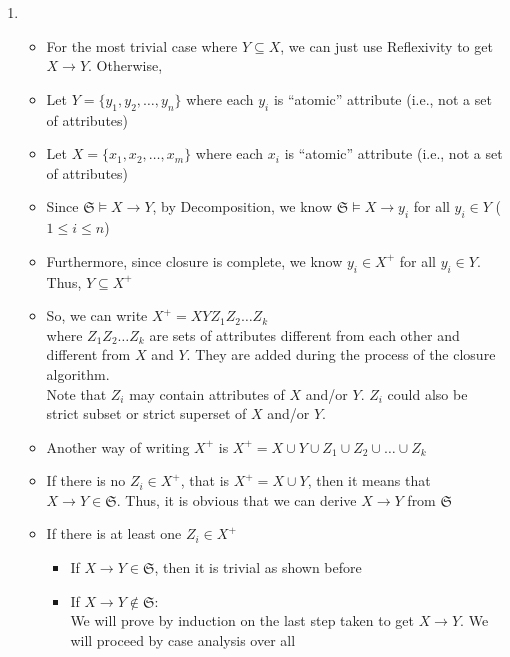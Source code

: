 \documentclass[12pt]{article}
\begin{document}
\begin{enumerate}
  \item 
    \begin{itemize}
      \item For the most trivial case where $Y \subseteq X$, we can just use
            Reflexivity to get $X \longrightarrow Y$. Otherwise,
      \item Let $Y = \{y_1, y_2, \dots, y_n\}$ where each $y_i$ is ``atomic''
            attribute (i.e., not a set of attributes)
      \item Let $X = \{x_1, x_2, \dots, x_m\}$ where each $x_i$ is ``atomic''
            attribute (i.e., not a set of attributes)
      \item Since $\mathfrak{S} \vDash X \longrightarrow Y$, by Decomposition,
            we know $\mathfrak{S} \vDash X \longrightarrow y_i$ for all $y_i \in
            Y$ ($1 \leq i \leq n$)
      \item Furthermore, since closure is complete, we know $y_i \in X^+$ for
            all $y_i \in Y$. Thus, $Y \subseteq X^+$
      \item So, we can write $X^+ = X Y Z_1 Z_2 \dots Z_k$ \\
            where $Z_1 Z_2 \dots Z_k$ are sets of attributes different from each
            other and different from $X$ and $Y$. They are added during the
            process of the closure algorithm. \\
            Note that $Z_i$ may contain attributes of $X$ and/or $Y$. $Z_i$
            could also be strict subset or strict superset of $X$ and/or $Y$. 
      \item Another way of writing $X^+$ is $X^+ = X \cup Y \cup Z_1 \cup Z_2
            \cup \dots \cup Z_k$
      \item If there is no $Z_i \in X^+$, that is $X^+ = X \cup Y$, then it
            means that $X \longrightarrow Y \in \mathfrak{S}$. Thus, it is
            obvious that we can derive $X \longrightarrow Y$ from $\mathfrak{S}$
      \item If there is at least one $Z_i \in X^+$
        \begin{itemize}
          \item If $X \longrightarrow Y \in \mathfrak{S}$, then it is trivial as
                shown before
          \item If $X \longrightarrow Y \not \in \mathfrak{S}$: \\
                We will prove by induction on the last step taken to get $X
                \longrightarrow Y$. We will proceed by case analysis over all

\end{itemize}
\end{itemize}
\end{enumerate}
\end{document}
